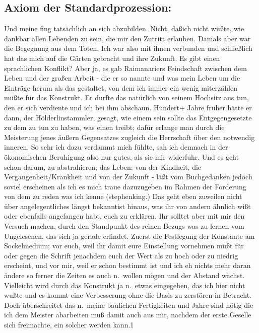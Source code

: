 \documentclass[
]{article}
\author{}
\date{\vspace{-2.5em}}
\begin{document}
\subsection{Axiom der
Standardprozession:}\label{axiom-der-standardprozession}

Und meine fing tatsächlich an sich abzubilden. Nicht, daßich nicht
wüßte, wie dankbar allen Lebenden zu sein, die mir den Zutritt erlauben.
Damals aber war die Begegnung aus dem Toten. Ich war also mit ihnen
verbunden und schließlich hat das mich auf die Gärten gebracht und ihre
Zukunft. Es gibt einen sprachlichen Konflikt? Aber ja, es gab
Raimanariers Feindschaft zwischen dem Leben und der großen Arbeit - die
er so nannte und was mein Leben um die Einträge herum als das gestaltet,
von dem ich immer ein wenig miterzählen müßte für das Konstrukt. Er
durfte das natürlich von seinem Hochsitz aus tun, den er sich verdiente
und ich bei ihm abschaun. Hundert+ Jahre früher hätte er dann, der
Hölderlinstammler, gesagt, wie einem sein sollte das Entgegengesetzte zu
dem zu tun zu haben, was einen treibt; dafür erlange man durch die
Meisterung jenes äußern Gegensatzes zugleich die Herrschaft über den
notwendig inneren. So sehr ich dazu verdammt mich fühlte, sah ich
demnach in der ökonomischen Beruhigung also nur gutes, als sie mir
widerfuhr. Und es geht schon darum, zu abstrahieren; das Leben: von der
Kindheit, die Vergangenheit/Krankheit und von der Zukunft - läßt vom
Buchgedanken jedoch soviel erscheinen als ich es mich traue dazuzugeben
im Rahmen der Forderung von dem zu reden was ich kenne (stephenking.)
Das geht eben zuweilen nicht über angelegentliches längst bekanntist
hinaus, was ihr von andern ähnlich wißt oder ebenfalls angefangen habt,
euch zu erklären. Ihr solltet aber mit mir den Versuch machen, durch den
Standpunkt des reinen Bezugs was zu lernen vom Ungelesenen, das sich ja
gerade erfindet. Zuerst die Festlegung der Konstante am Sockelmedium;
vor euch, weil ihr damit eure Einstellung vornehmen müßt für oder gegen
die Schrift jenachdem euch der Wert als zu hoch oder zu niedrig
erscheint, und vor mir, weil er schon bestimmt ist und ich eh nichts
mehr daran ändere so ferner die Zeiten es auch n.~wollen mögen und der
Abstand wächst. Vielleicht wird durch das Konstrukt ja n.~etwas
eingegeben, das ich hier nicht wußte und es kommt eine Verbesserung ohne
die Basis zu zerstören in Betracht. Doch überschreitet das n.~meine
baulichen Fertigkeiten und Jahre sind nötig die ich dem Meister
abarbeiten muß damit auch aus mir, nachdem der erste Geselle sich
freimachte, ein solcher werden kann.1
\end{document}
